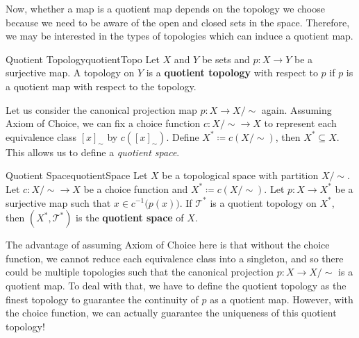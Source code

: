 \documentclass[math]{amznotes}
\theoremstyle{remark}
\begin{document}
Now, whether a map is a quotient map depends on the topology we choose because we need to be aware of the open and closed sets in the space. Therefore, we may be interested in the types of topologies which can induce a quotient map.
\begin{dfnbox}{Quotient Topology}{quotientTopo}
    Let $X$ and $Y$ be sets and $p \colon X \to Y$ be a surjective map. A topology on $Y$ is a {\color{red} \textbf{quotient topology}} with respect to $p$ if $p$ is a quotient map with respect to the topology.
\end{dfnbox}
Let us consider the canonical projection map $p \colon X \to X \slash \sim$ again. Assuming Axiom of Choice, we can fix a choice function $c \colon X \slash \sim \to X$ to represent each equivalence class $\left[x\right]_{\sim}$ by $c\left(\left[x\right]_{\sim}\right)$. Define $X^* \coloneqq c\left(X \slash \sim\right)$, then $X^* \subseteq X$. This allows us to define a \textit{quotient space}.
\begin{dfnbox}{Quotient Space}{quotientSpace}
    Let $X$ be a topological space with partition $X \slash \sim$. Let $c \colon X \slash \sim \to X$ be a choice function and $X^* \coloneqq c\left(X \slash \sim\right)$. Let $p \colon X \to X^*$ be a surjective map such that $x \in c^{-1}\bigl(p\left(x\right)\bigr)$. If $\mathcal{T}^*$ is a quotient topology on $X^*$, then $\left(X^*, \mathcal{T}^*\right)$ is the {\color{red} \textbf{quotient space}} of $X$.
\end{dfnbox}
The advantage of assuming Axiom of Choice here is that without the choice function, we cannot reduce each equivalence class into a singleton, and so there could be multiple topologies such that the canonical projection $p \colon X \to X \slash \sim$ is a quotient map. To deal with that, we have to define the quotient topology as the finest topology to guarantee the continuity of $p$ as a quotient map. However, with the choice function, we can actually guarantee the uniqueness of this quotient topology!
\end{document}
